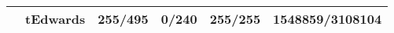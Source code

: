 \begin{table}[!h]
\begin{tabular}{llllll}
\multicolumn{1}{|l|}{}                   & \multicolumn{1}{l|}{tEdwards}    & \multicolumn{1}{l|}{255/495}                                                      & \multicolumn{1}{l|}{0/240}   & \multicolumn{1}{l|}{255/255} & \multicolumn{1}{l|}{1548859/3108104}                                              \\ \hline
\end{tabular}
\end{table}



